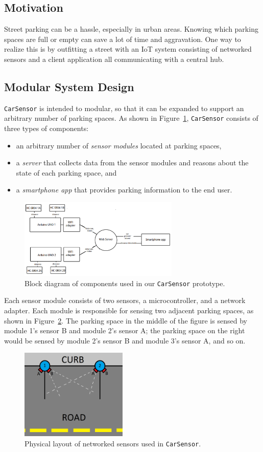 \documentclass[conference]{IEEEtran}
\begin{document}
\subsection{Motivation}
Street parking can be a hassle, especially in urban areas. Knowing which parking spaces are full or empty can save a lot of time and aggravation. One way to realize this is by outfitting a street with an IoT system consisting of networked sensors and a client application all communicating with a central hub.

\subsection{Modular System Design}
\texttt{CarSensor} is intended to modular, so that it can be expanded to support an arbitrary number of parking spaces. As shown in Figure~\ref{fig_blockdiagram}, \texttt{CarSensor} consists of three types of components:
\begin{itemize}
\item an arbitrary number of \textit{sensor modules} located at parking spaces,
\item a \textit{server} that collects data from the sensor modules and reasons about the state of each parking space, and
\item a \textit{smartphone app} that provides parking information to the end user.
\end{itemize}

\begin{figure}[h]
\centering
\includegraphics[width=3.0in]{block_diagram_0.png}
\caption{Block diagram of components used in our \texttt{CarSensor} prototype.}
\label{fig_blockdiagram}
\end{figure}

Each sensor module consists of two sensors, a microcontroller, and a network adapter. Each module is responsible for sensing two adjacent parking spaces, as shown in Figure~\ref{fig_curb}. The parking space in the middle of the figure is sensed by module 1's sensor B and module 2's sensor A; the parking space on the right would be sensed by module 2's sensor B and module 3's sensor A, and so on.
\begin{figure}[h]
\centering
\includegraphics[width=2.0in]{parkingspace.png}
\caption{Physical layout of networked sensors used in \texttt{CarSensor}.}
\label{fig_curb}
\end{figure}
\end{document}

